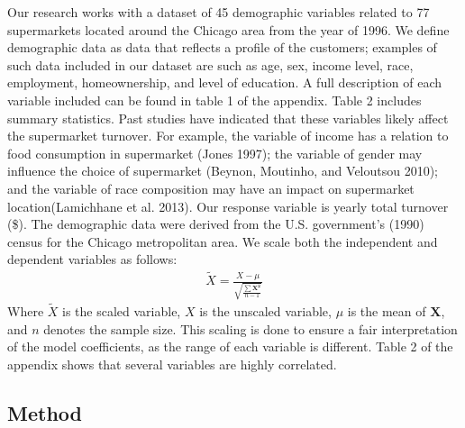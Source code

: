 \documentclass[
]{article}
\begin{document}
Our research works with a dataset of 45 demographic variables related to
77 supermarkets located around the Chicago area from the year of 1996.
We define demographic data as data that reflects a profile of the
customers; examples of such data included in our dataset are such as
age, sex, income level, race, employment, homeownership, and level of
education. A full description of each variable included can be found in
table 1 of the appendix. Table 2 includes summary statistics. Past
studies have indicated that these variables likely affect the
supermarket turnover. For example, the variable of income has a relation
to food consumption in supermarket (Jones 1997); the variable of gender
may influence the choice of supermarket (Beynon, Moutinho, and Veloutsou
2010); and the variable of race composition may have an impact on
supermarket location(Lamichhane et al. 2013). Our response variable is
yearly total turnover (\$). The demographic data were derived from the
U.S. government's (1990) census for the Chicago metropolitan area. We
scale both the independent and dependent variables as follows:\\
\begin{align*}
\tilde{X} = \frac{X - \mu}{\sqrt{\frac{\sum \boldsymbol{X^2}}{n-1} }}
\end{align*} Where \(\tilde{X}\) is the scaled variable, \(X\) is the
unscaled variable, \(\mu\) is the mean of \(\boldsymbol{X}\), and \(n\)
denotes the sample size. This scaling is done to ensure a fair
interpretation of the model coefficients, as the range of each variable
is different. Table 2 of the appendix shows that several variables are
highly correlated.

\hypertarget{method}{%
\subsection{Method}\label{method}}
\end{document}
